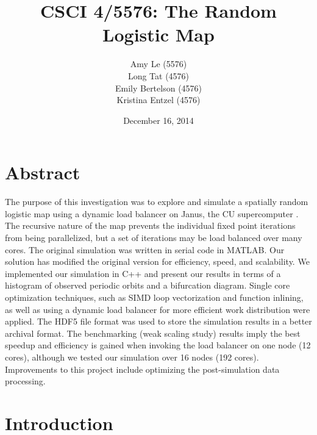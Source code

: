 \documentclass[12pt]{article}
\begin{document}
\pagestyle{plain} %
\title{CSCI 4/5576: The Random Logistic Map}
\date{December 16, 2014}
\author{Amy Le (5576)\\Long Tat (4576)\\Emily Bertelson (4576)\\Kristina Entzel (4576)}
\maketitle
\section{Abstract}
The purpose of this investigation was to explore and simulate a
spatially random logistic map using a dynamic load balancer on Janus, the CU
supercomputer \cite{janus}. The recursive nature of the map prevents the individual
fixed point iterations from being parallelized, but a set of
iterations may be load balanced over many cores. The original simulation was written in serial code in
MATLAB. Our solution has modified the original version for efficiency,
speed, and scalability. We implemented our simulation in C++ and present our
results in terms of a histogram of observed periodic orbits and a
bifurcation diagram. Single core optimization techniques,
such as SIMD loop vectorization and function inlining, as well as
using a dynamic load balancer for more efficient work distribution
were applied. The HDF5 file format was used to store the simulation results in a better archival format. The benchmarking (weak scaling study) results imply the best
speedup and efficiency is gained when invoking the load balancer on
one node (12 cores), although we tested our simulation over 16 nodes
(192 cores). Improvements to this project include optimizing the
post-simulation data processing. 
\newpage
\section{Introduction}
\end{document}
